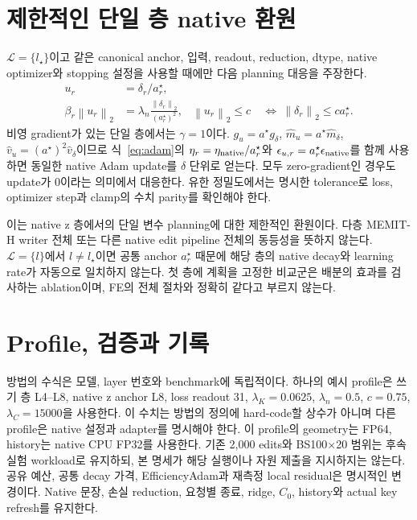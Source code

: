 \documentclass[11pt]{article}
\newcommand{\norm}[1]{\left\lVert #1\right\rVert}
\begin{document}
\section{제한적인 단일 층 native 환원}
$\mathcal L=\{l_\star\}$이고 같은 canonical anchor, 입력, readout,
reduction, dtype, native optimizer와 stopping 설정을 사용할 때에만
다음 planning 대응을 주장한다.
\begin{align}
 u_r&=\delta_r/a^\star_r,\\
 \beta_r\norm{u_r}_2
 &=\lambda_n\frac{\norm{\delta_r}_2}{(a^\star_r)^2},&
 \norm{u_r}_2\le c
 &\ \Longleftrightarrow\ \norm{\delta_r}_2\le c a^\star_r.
\end{align}
비영 gradient가 있는 단일 층에서는 $\gamma=1$이다.
$g_u=a^\star g_\delta$, $\widehat m_u=a^\star\widehat m_\delta$,
$\widehat v_u=(a^\star)^2\widehat v_\delta$이므로
식~\eqref{eq:adam}의 $\eta_r=\eta_{\rm native}/a^\star_r$와
$\epsilon_{u,r}=a^\star_r\epsilon_{\rm native}$를 함께 사용하면
동일한 native Adam update를 $\delta$ 단위로 얻는다. 모두 zero-gradient인
경우도 update가 0이라는 의미에서 대응한다. 유한 정밀도에서는 명시한
tolerance로 loss, optimizer step과 clamp의 수치 parity를 확인해야 한다.

이는 native z 층에서의 단일 변수 planning에 대한 제한적인 환원이다.
다층 MEMIT-H writer 전체 또는 다른 native edit pipeline 전체의
동등성을 뜻하지 않는다. $\mathcal L=\{l\}$에서 $l\ne l_\star$이면
공통 anchor $a^\star_r$ 때문에 해당 층의 native decay와 learning rate가
자동으로 일치하지 않는다. 첫 층에 계획을 고정한 비교군은 배분의
효과를 검사하는 ablation이며, FE의 전체 절차와 정확히 같다고 부르지
않는다.

\section{Profile, 검증과 기록}
방법의 수식은 모델, layer 번호와 benchmark에 독립적이다. 하나의 예시
profile은 쓰기 층 L4--L8, native z anchor L8, loss readout 31,
$\lambda_K=0.0625$, $\lambda_n=0.5$, $c=0.75$,
$\lambda_C=15000$을 사용한다. 이 수치는 방법의 정의에 hard-code할
상수가 아니며 다른 profile은 native 설정과 adapter를 명시해야 한다.
이 profile의 geometry는 FP64, history는 native CPU FP32를 사용한다.
기존 2,000 edits와 BS100$\times$20 범위는 후속 실험 workload로
유지하되, 본 명세가 해당 실행이나 자원 제출을 지시하지는 않는다.
공유 예산, 공통 decay 가격, EfficiencyAdam과 재측정 local residual은
명시적인 변경이다. Native 문장, 손실 reduction, 요청별 종료, ridge,
$C_0$, history와 actual key refresh를 유지한다.
\end{document}
